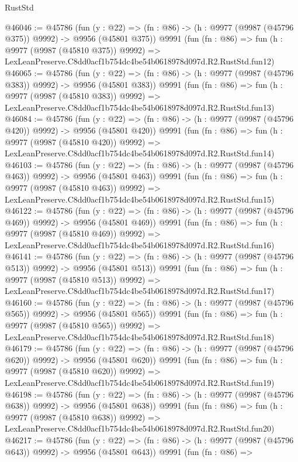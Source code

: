 \begin{lexlean}{RustStd}
\begin{coremodule}
@46046 := @45786
    (fun (y : @22) => (fn : @86) -> (h : @9977 (@9987 (@45796 @375)) @9992) -> @9956 (@45801 @375))
    @9991
    (fun (fn : @86) =>
    fun (h : @9977 (@9987 (@45810 @375)) @9992) =>
    LexLeanPreserve.C8dd0acf1b754dc4be54b0618978d097d.R2.RustStd.fun12)
@46065 := @45786
    (fun (y : @22) => (fn : @86) -> (h : @9977 (@9987 (@45796 @383)) @9992) -> @9956 (@45801 @383))
    @9991
    (fun (fn : @86) =>
    fun (h : @9977 (@9987 (@45810 @383)) @9992) =>
    LexLeanPreserve.C8dd0acf1b754dc4be54b0618978d097d.R2.RustStd.fun13)
@46084 := @45786
    (fun (y : @22) => (fn : @86) -> (h : @9977 (@9987 (@45796 @420)) @9992) -> @9956 (@45801 @420))
    @9991
    (fun (fn : @86) =>
    fun (h : @9977 (@9987 (@45810 @420)) @9992) =>
    LexLeanPreserve.C8dd0acf1b754dc4be54b0618978d097d.R2.RustStd.fun14)
@46103 := @45786
    (fun (y : @22) => (fn : @86) -> (h : @9977 (@9987 (@45796 @463)) @9992) -> @9956 (@45801 @463))
    @9991
    (fun (fn : @86) =>
    fun (h : @9977 (@9987 (@45810 @463)) @9992) =>
    LexLeanPreserve.C8dd0acf1b754dc4be54b0618978d097d.R2.RustStd.fun15)
@46122 := @45786
    (fun (y : @22) => (fn : @86) -> (h : @9977 (@9987 (@45796 @469)) @9992) -> @9956 (@45801 @469))
    @9991
    (fun (fn : @86) =>
    fun (h : @9977 (@9987 (@45810 @469)) @9992) =>
    LexLeanPreserve.C8dd0acf1b754dc4be54b0618978d097d.R2.RustStd.fun16)
@46141 := @45786
    (fun (y : @22) => (fn : @86) -> (h : @9977 (@9987 (@45796 @513)) @9992) -> @9956 (@45801 @513))
    @9991
    (fun (fn : @86) =>
    fun (h : @9977 (@9987 (@45810 @513)) @9992) =>
    LexLeanPreserve.C8dd0acf1b754dc4be54b0618978d097d.R2.RustStd.fun17)
@46160 := @45786
    (fun (y : @22) => (fn : @86) -> (h : @9977 (@9987 (@45796 @565)) @9992) -> @9956 (@45801 @565))
    @9991
    (fun (fn : @86) =>
    fun (h : @9977 (@9987 (@45810 @565)) @9992) =>
    LexLeanPreserve.C8dd0acf1b754dc4be54b0618978d097d.R2.RustStd.fun18)
@46179 := @45786
    (fun (y : @22) => (fn : @86) -> (h : @9977 (@9987 (@45796 @620)) @9992) -> @9956 (@45801 @620))
    @9991
    (fun (fn : @86) =>
    fun (h : @9977 (@9987 (@45810 @620)) @9992) =>
    LexLeanPreserve.C8dd0acf1b754dc4be54b0618978d097d.R2.RustStd.fun19)
@46198 := @45786
    (fun (y : @22) => (fn : @86) -> (h : @9977 (@9987 (@45796 @638)) @9992) -> @9956 (@45801 @638))
    @9991
    (fun (fn : @86) =>
    fun (h : @9977 (@9987 (@45810 @638)) @9992) =>
    LexLeanPreserve.C8dd0acf1b754dc4be54b0618978d097d.R2.RustStd.fun20)
@46217 := @45786
    (fun (y : @22) => (fn : @86) -> (h : @9977 (@9987 (@45796 @643)) @9992) -> @9956 (@45801 @643))
    @9991
    (fun (fn : @86) =>

\end{coremodule}
\end{lexlean}
